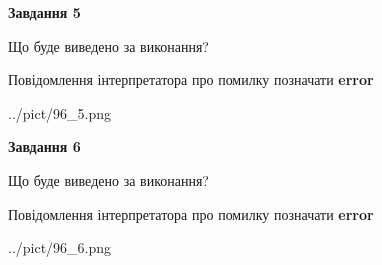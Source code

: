 \documentclass[12pt, ukrainian]{article}
\begin{document}
{{\begin {center}\textbf{Завдання 5}\end {center}}\par
Що буде виведено за виконання? \par
Повідомлення інтерпретатора про помилку позначати \textbf{error}

\begin{center}
	{../pict/96_5.png}
\end{center}
\newpage

{\begin {center}\textbf{Завдання 6}\end {center}}\par
Що буде виведено за виконання? \par
Повідомлення інтерпретатора про помилку позначати \textbf{error}

\begin{center}
	{../pict/96_6.png}
\end{center}
\newpage

}
\end{document}
